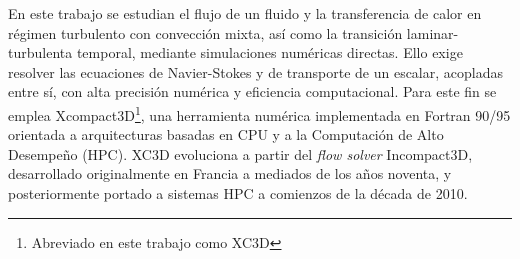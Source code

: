 


En este trabajo se estudian el flujo de un fluido y la transferencia de calor en régimen turbulento con convección mixta, así como la transición laminar-turbulenta temporal, mediante simulaciones numéricas directas. Ello exige resolver las ecuaciones de Navier-Stokes y de transporte de un escalar, acopladas entre sí, con alta precisión numérica y eficiencia computacional. Para este fin se emplea Xcompact3D\footnote{Abreviado en este trabajo como XC3D}, una herramienta numérica implementada en Fortran 90/95 orientada a arquitecturas basadas en CPU y a la Computación de Alto Desempeño (HPC). XC3D evoluciona a partir del \textit{flow solver} Incompact3D, desarrollado originalmente en Francia a mediados de los años noventa, y posteriormente portado a sistemas HPC a comienzos de la década de 2010.

